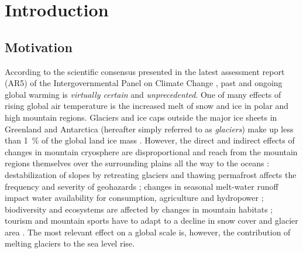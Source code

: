 \chapter{Introduction}\label{chap:introduction}
\thispagestyle{plain}

\section{Motivation} %
\label{sec:motivation}


    According to the scientific consensus presented in the latest assessment report (AR5) of the Intergovernmental Panel on Climate Change \citep{IPCC2013}, past and ongoing global warming is \emph{virtually certain} and \emph{unprecedented}. One of many effects of rising global air temperature is the increased melt of snow and ice in polar and high mountain regions. Glaciers and ice caps outside the major ice sheets in Greenland and Antarctica (hereafter simply referred to as \emph{glaciers}) make up less than \SI{1}{\percent} of the global land ice mass \citep[cf.][]{Farinotti2019, Vaughan2013}. However, the direct and indirect effects of changes in mountain cryosphere are disproportional and reach from the mountain regions themselves over the surrounding plains all the way to the oceans \citep{IPCC2019_TS}: destabilization of slopes by retreating glaciers and thawing permafrost affects the frequency and severity of geohazards \citep[e.g.,][]{Richardson2000, Deline2015, Haeberli2017}; changes in seasonal melt-water runoff impact water availability for consumption, agriculture and hydropower \citep[e.g.,][]{Farinotti2016,Huss2018, Ali2018, Immerzeel2020}; biodiversity and ecosystems are affected by changes in mountain habitats \citep[e.g.,][]{Milner2017}; tourism and mountain sports have to adapt to a decline in snow cover and glacier area \citep[e.g.,][]{Stewart2016, Lemieux2018, Mourey2019}. The most relevant effect on a global scale is, however, the contribution of melting glaciers to the sea level rise.

